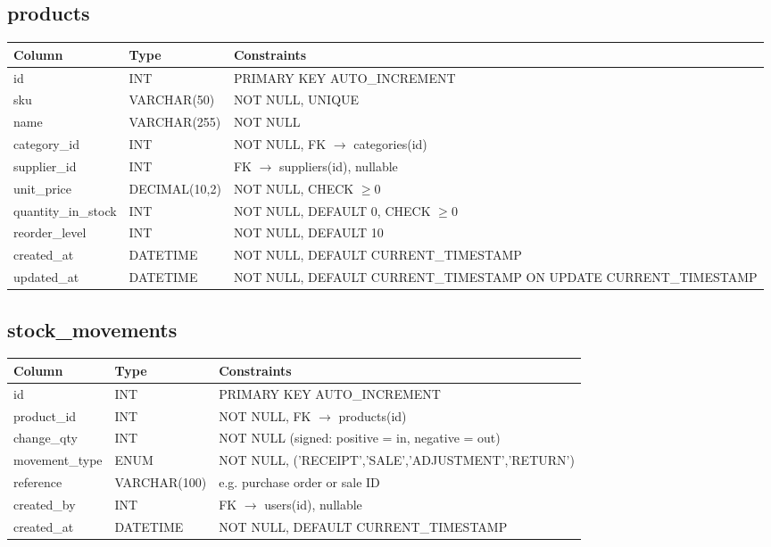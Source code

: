 \documentclass[11pt,a4paper]{report}
\newcommand{\schemahead}{%
  \toprule
  \textbf{Column} & \textbf{Type} & \textbf{Constraints} \\
  \midrule
}
\begin{document}
\subsection*{products}
\begin{center}
\begin{tabular}{@{}p{3.6cm}p{2.6cm}p{7.3cm}@{}}
\schemahead
id & INT & PRIMARY KEY AUTO\_INCREMENT \\
sku & VARCHAR(50) & NOT NULL, UNIQUE \\
name & VARCHAR(255) & NOT NULL \\
category\_id & INT & NOT NULL, FK $\rightarrow$ categories(id) \\
supplier\_id & INT & FK $\rightarrow$ suppliers(id), nullable \\
unit\_price & DECIMAL(10,2) & NOT NULL, CHECK $\geq 0$ \\
quantity\_in\_stock & INT & NOT NULL, DEFAULT 0, CHECK $\geq 0$ \\
reorder\_level & INT & NOT NULL, DEFAULT 10 \\
created\_at & DATETIME & NOT NULL, DEFAULT CURRENT\_TIMESTAMP \\
updated\_at & DATETIME & NOT NULL, DEFAULT CURRENT\_TIMESTAMP ON UPDATE CURRENT\_TIMESTAMP \\
\bottomrule
\end{tabular}
\end{center}

\subsection*{stock\_movements}
\begin{center}
\begin{tabular}{@{}p{3.6cm}p{2.6cm}p{7.3cm}@{}}
\schemahead
id & INT & PRIMARY KEY AUTO\_INCREMENT \\
product\_id & INT & NOT NULL, FK $\rightarrow$ products(id) \\
change\_qty & INT & NOT NULL (signed: positive = in, negative = out) \\
movement\_type & ENUM & NOT NULL, ('RECEIPT','SALE','ADJUSTMENT','RETURN') \\
reference & VARCHAR(100) & e.g. purchase order or sale ID \\
created\_by & INT & FK $\rightarrow$ users(id), nullable \\
created\_at & DATETIME & NOT NULL, DEFAULT CURRENT\_TIMESTAMP \\
\bottomrule
\end{tabular}
\end{center}
\end{document}
